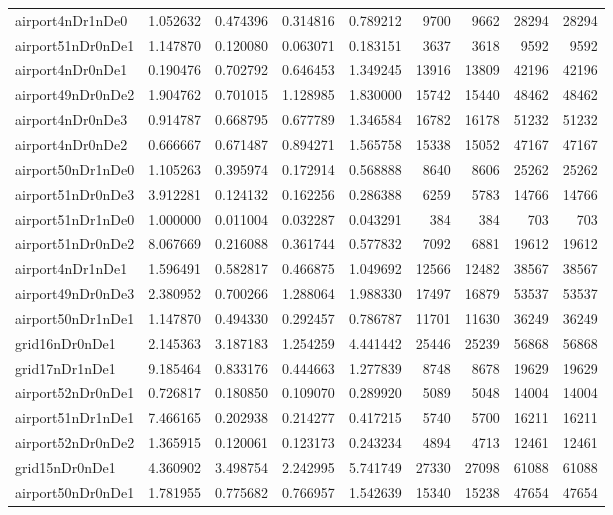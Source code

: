 \begin{longtable}{|l|r|r|r|r|r|r|r|r|}
airport4nDr1nDe0 & 1.052632 & 0.474396 & 0.314816 & 0.789212 & 9700 & 9662 & 28294 & 28294 \\
airport51nDr0nDe1 & 1.147870 & 0.120080 & 0.063071 & 0.183151 & 3637 & 3618 & 9592 & 9592 \\
airport4nDr0nDe1 & 0.190476 & 0.702792 & 0.646453 & 1.349245 & 13916 & 13809 & 42196 & 42196 \\
airport49nDr0nDe2 & 1.904762 & 0.701015 & 1.128985 & 1.830000 & 15742 & 15440 & 48462 & 48462 \\
airport4nDr0nDe3 & 0.914787 & 0.668795 & 0.677789 & 1.346584 & 16782 & 16178 & 51232 & 51232 \\
airport4nDr0nDe2 & 0.666667 & 0.671487 & 0.894271 & 1.565758 & 15338 & 15052 & 47167 & 47167 \\
airport50nDr1nDe0 & 1.105263 & 0.395974 & 0.172914 & 0.568888 & 8640 & 8606 & 25262 & 25262 \\
airport51nDr0nDe3 & 3.912281 & 0.124132 & 0.162256 & 0.286388 & 6259 & 5783 & 14766 & 14766 \\
airport51nDr1nDe0 & 1.000000 & 0.011004 & 0.032287 & 0.043291 & 384 & 384 & 703 & 703 \\
airport51nDr0nDe2 & 8.067669 & 0.216088 & 0.361744 & 0.577832 & 7092 & 6881 & 19612 & 19612 \\
airport4nDr1nDe1 & 1.596491 & 0.582817 & 0.466875 & 1.049692 & 12566 & 12482 & 38567 & 38567 \\
airport49nDr0nDe3 & 2.380952 & 0.700266 & 1.288064 & 1.988330 & 17497 & 16879 & 53537 & 53537 \\
airport50nDr1nDe1 & 1.147870 & 0.494330 & 0.292457 & 0.786787 & 11701 & 11630 & 36249 & 36249 \\
grid16nDr0nDe1 & 2.145363 & 3.187183 & 1.254259 & 4.441442 & 25446 & 25239 & 56868 & 56868 \\
grid17nDr1nDe1 & 9.185464 & 0.833176 & 0.444663 & 1.277839 & 8748 & 8678 & 19629 & 19629 \\
airport52nDr0nDe1 & 0.726817 & 0.180850 & 0.109070 & 0.289920 & 5089 & 5048 & 14004 & 14004 \\
airport51nDr1nDe1 & 7.466165 & 0.202938 & 0.214277 & 0.417215 & 5740 & 5700 & 16211 & 16211 \\
airport52nDr0nDe2 & 1.365915 & 0.120061 & 0.123173 & 0.243234 & 4894 & 4713 & 12461 & 12461 \\
grid15nDr0nDe1 & 4.360902 & 3.498754 & 2.242995 & 5.741749 & 27330 & 27098 & 61088 & 61088 \\
airport50nDr0nDe1 & 1.781955 & 0.775682 & 0.766957 & 1.542639 & 15340 & 15238 & 47654 & 47654 \\

\end{longtable}
